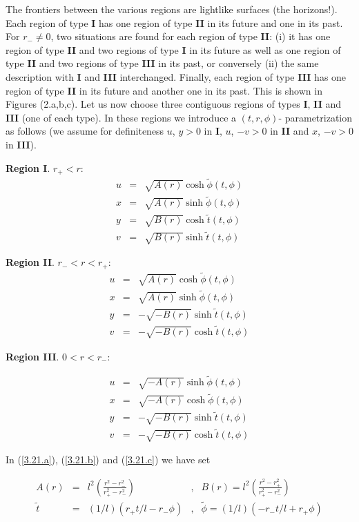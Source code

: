 \documentclass[12pt]{article}
\newcounter{c1} \newcounter{c2}
\newcommand{\bb}{\begin{equation}}
\newcommand{\ee}{\end{equation}}
\newcommand{\br}{\begin{eqnarray}}
\newcommand{\er}{\end{eqnarray}}
\begin{document}
The frontiers between the various regions are lightlike surfaces
(the horizons!). Each region of type {\bf I} has one region of
type {\bf II} in its future and one in its past. For $r_{-} \neq 0$, two
 situations are found for
each region of type {\bf II}: (i) it has one region of type {\bf
II} and two regions of type {\bf I} in its future as well as one
region of type {\bf II} and two regions of type {\bf III} in its past,
or conversely (ii) the same description with {\bf I} and {\bf III}
interchanged.
 Finally,
each region of type {\bf III} has one region of type {\bf II} in
its future and another one in its past.  This is shown in
Figures (2.a,b,c).
Let us now choose three contiguous regions of types {\bf I}, {\bf
II} and {\bf III}
(one of each type). In these regions we introduce a
$(t,r,\phi)$- parametrization as follows (we assume for
definiteness $u$, $y >0$ in {\bf I}, $u$, $-v >0$ in {\bf II} and $x$, $-v
>0$ in {\bf III}).

{\bf Region  I}. $r_{+} < r$:
\br
u & = & \sqrt{A(r)} \cosh \tilde{\phi}(t,\phi)  \nonumber \\
x & = & \sqrt{A(r)} \sinh \tilde{\phi}(t,\phi)  \nonumber \\
y & = & \sqrt{B(r)} \cosh \tilde{t}(t,\phi)  \nonumber \\
v & = & \sqrt{B(r)} \sinh \tilde{t}(t,\phi)
\label{3.21.a}
\er


{\bf Region II}. $r_{-} < r < r_{+}$:
\br
u & = & \sqrt{A(r)} \cosh \tilde{\phi}(t,\phi)  \nonumber \\
x & = & \sqrt{A(r)} \sinh \tilde{\phi}(t,\phi)  \nonumber \\
y & = & -\sqrt{-B(r)}\sinh \tilde{t}(t,\phi)  \nonumber \\
v & = & -\sqrt{-B(r)} \cosh \tilde{t}(t,\phi)
\label{3.21.b}
\er

{\bf Region III}. $ 0 < r <r_{-}$:

\br
u & = & \sqrt{-A(r)} \sinh \tilde{\phi}(t,\phi)  \nonumber \\
x & = & \sqrt{-A(r)} \cosh \tilde{\phi}(t,\phi)  \nonumber \\
y & = & -\sqrt{-B(r)} \sinh \tilde{t}(t,\phi)  \nonumber \\
v & = & -\sqrt{-B(r)} \cosh \tilde{t}(t,\phi)
\label{3.21.c}
\er

In (\ref{3.21.a}), (\ref{3.21.b}) and (\ref{3.21.c}) we have set

\bb
\begin{array}{rclcl}
A(r) & = & l^2\left(\frac{r^2 - r_{-}^2}{r_{+}^2 - r_{-}^2}\right) & , &
B(r) = l^2\left(\frac{r^2- r_{+}^2}{r_{+}^2 - r_{-}^2}\right)
\label{3.18.d} \\
\tilde{t} & = & (1/l) \left(r_{+}t/l - r_{-}\phi\right) & , & \tilde{\phi}  =
 (1/l)  \left(-r_{-} t/l + r_{+}\phi \right)
\label{3.18.e}\\
\label{3.21.f}
\end{array}
\ee
\end{document}
